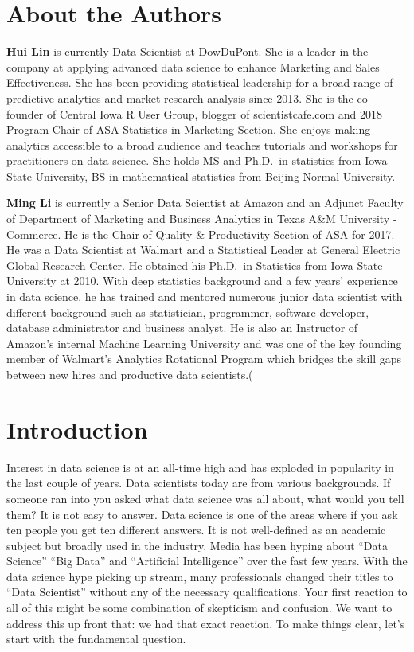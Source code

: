 \documentclass[12pt,]{krantz}
\theoremstyle{definition}
\theoremstyle{definition}
\theoremstyle{remark}
\begin{document}
\chapter*{About the Authors}\label{about-the-authors}


\textbf{Hui Lin} is currently Data Scientist at DowDuPont. She is a
leader in the company at applying advanced data science to enhance
Marketing and Sales Effectiveness. She has been providing statistical
leadership for a broad range of predictive analytics and market research
analysis since 2013. She is the co-founder of Central Iowa R User Group,
blogger of scientistcafe.com and 2018 Program Chair of ASA Statistics in
Marketing Section. She enjoys making analytics accessible to a broad
audience and teaches tutorials and workshops for practitioners on data
science. She holds MS and Ph.D.~in statistics from Iowa State
University, BS in mathematical statistics from Beijing Normal
University.

\textbf{Ming Li} is currently a Senior Data Scientist at Amazon and an
Adjunct Faculty of Department of Marketing and Business Analytics in
Texas A\&M University - Commerce. He is the Chair of Quality \&
Productivity Section of ASA for 2017. He was a Data Scientist at Walmart
and a Statistical Leader at General Electric Global Research Center. He
obtained his Ph.D.~in Statistics from Iowa State University at 2010.
With deep statistics background and a few years' experience in data
science, he has trained and mentored numerous junior data scientist with
different background such as statistician, programmer, software
developer, database administrator and business analyst. He is also an
Instructor of Amazon's internal Machine Learning University and was one
of the key founding member of Walmart's Analytics Rotational Program
which bridges the skill gaps between new hires and productive data
scientists.(

\mainmatter

\chapter{Introduction}\label{introduction}

Interest in data science is at an all-time high and has exploded in
popularity in the last couple of years. Data scientists today are from
various backgrounds. If someone ran into you asked what data science was
all about, what would you tell them? It is not easy to answer. Data
science is one of the areas where if you ask ten people you get ten
different answers. It is not well-defined as an academic subject but
broadly used in the industry. Media has been hyping about ``Data
Science'' ``Big Data'' and ``Artificial Intelligence'' over the fast few
years. With the data science hype picking up stream, many professionals
changed their titles to ``Data Scientist'' without any of the necessary
qualifications. Your first reaction to all of this might be some
combination of skepticism and confusion. We want to address this up
front that: we had that exact reaction. To make things clear, let's
start with the fundamental question.
\end{document}
